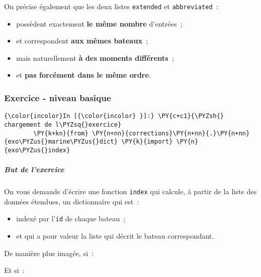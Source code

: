     On précise également que les deux listes \texttt{extended} et
\texttt{abbreviated}~:

\begin{itemize}
	\item 
	possèdent exactement \textbf{le même nombre} d'entrées~;
	\item
	et correspondent \textbf{aux mêmes bateaux}~;
	\item
	mais naturellement \textbf{à des moments différents}~;
	\item
	et \textbf{pas forcément dans le même ordre}.
\end{itemize}

    \hypertarget{exercice---niveau-basique}{%
\subsubsection{Exercice - niveau
basique}\label{exercice---niveau-basique}}

    \begin{Verbatim}[commandchars=\\\{\}]
{\color{incolor}In [{\color{incolor} }]:} \PY{c+c1}{\PYZsh{} chargement de l\PYZsq{}exercice}
        \PY{k+kn}{from} \PY{n+nn}{corrections}\PY{n+nn}{.}\PY{n+nn}{exo\PYZus{}marine\PYZus{}dict} \PY{k}{import} \PY{n}{exo\PYZus{}index}
\end{Verbatim}


    \hypertarget{but-de-lexercice}{%
\subparagraph{But de l'exercice}\label{but-de-lexercice}}

    On vous demande d'écrire une fonction \texttt{index} qui calcule, à
partir de la liste des données étendues, un dictionnaire qui est~:

\begin{itemize}
	\item 
	indexé par l'\texttt{id} de chaque bateau~;
	\item
	et qui a pour valeur la liste qui décrit le bateau correspondant.
\end{itemize}

    De manière plus imagée, si~:

\begin{Shaded}
\begin{Highlighting}[]
\OperatorTok{=}
\end{Highlighting}
\end{Shaded}

Et si~:

\begin{Shaded}
\begin{Highlighting}[]
\OperatorTok{=}\NormalTok{ [ id1, latitude, ... ]}
\end{Highlighting}
\end{Shaded}

